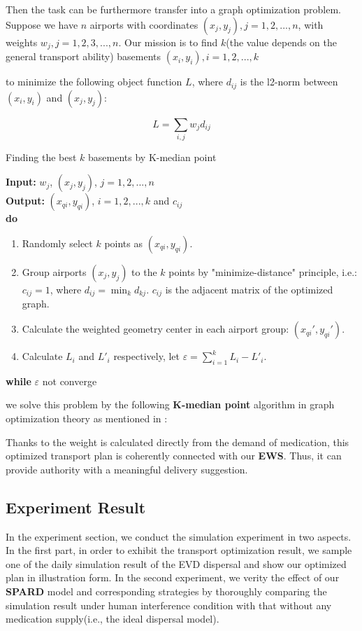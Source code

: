 Then the task can be furthermore transfer into a graph optimization problem. Suppose we have $n$ airports with coordinates $(x_{j},y_{j}), j=1,2,...,n$, with weights $w_{j},j=1,2,3,...,n$. Our mission is to find $k$(the value depends on the general transport ability) basements $(x_{i},y_{i}), i=1,2,...,k$ {to minimize the following object function $L$, where $d_{ij}$ is the l2-norm between $(x_{i},y_{i})$ and $(x_{j},y_{j})$:

\begin{equation}
L=\sum _{i,j}w_{j}d_{ij}
\end{equation}

\begin{algorithm}[htbp] 
\caption{\small Finding the best $k$ basements by K-median point} 
\textbf{Input:} $w_{j}$, $(x_{j},y_{j})$, $j=1,2,...,n$ \\
\textbf{Output:} $(x_{qi},y_{qi})$, $i=1,2,...,k$ and $c_{ij}$ \\
\textbf{do}
\begin{enumerate} 
\item Randomly select $k$ points as  $(x_{qi},y_{qi})$. 
\item Group airports $(x_{j},y_{j})$ to the $k$ points by "minimize-distance" principle, i.e.: \\ 
  $c_{ij}=1$, where $d_{ij}=\min_{k}d_{kj}$. $c_{ij}$ is the adjacent matrix of the optimized graph.
\item Calculate the weighted geometry center in each airport group: $(x_{qi}',y_{qi}')$.
\item Calculate $L_{i}$ and $L'_{i}$ respectively, let $\varepsilon=\sum_{i=1}^{k}L_{i}-L'_{i}$.
\end{enumerate} 
\textbf{while} $\varepsilon$ not converge 
\label{alg1} 
\end{algorithm}

we solve this problem by the following \textbf{K-median point} algorithm in graph optimization theory as mentioned in \cite{har2005smaller}:

Thanks to the weight is calculated directly from the demand of medication, this optimized transport plan is coherently connected with our \textbf{EWS}. Thus, it can provide authority with a meaningful delivery suggestion.

\subsection{Experiment Result}
In the experiment section, we conduct the simulation experiment in two aspects. In the first part, in order to exhibit the transport optimization result, we sample one of the daily simulation result of the EVD dispersal and show our optimized plan in illustration form. In the second experiment, we verity the effect of our \textbf{SPARD} model and corresponding strategies by thoroughly comparing the simulation result under human interference condition with that without any medication supply(i.e., the ideal dispersal model).

}
